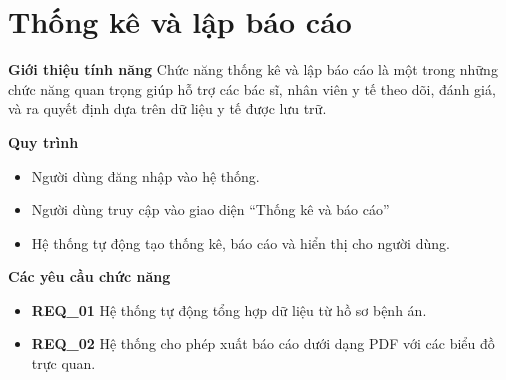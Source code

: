 \section{Thống kê và lập báo cáo}

\noindent \textbf{Giới thiệu tính năng}
Chức năng thống kê và lập báo cáo là một trong những chức năng quan trọng giúp hỗ trợ các bác sĩ, nhân viên y tế theo dõi, đánh giá, và ra quyết định dựa trên dữ liệu y tế được lưu trữ.

\noindent \textbf{Quy trình}
\begin{itemize}
    \item Người dùng đăng nhập vào hệ thống.
    \item Người dùng truy cập vào giao diện ``Thống kê và báo cáo''
    \item Hệ thống tự động tạo thống kê, báo cáo và hiển thị cho người dùng.
\end{itemize}

\noindent \textbf{Các yêu cầu chức năng}
\begin{itemize}
    \item \textbf{REQ\_01} Hệ thống tự động tổng hợp dữ liệu từ hồ sơ bệnh án.
    \item \textbf{REQ\_02} Hệ thống cho phép xuất báo cáo dưới dạng PDF với các biểu đồ trực quan.
\end{itemize}